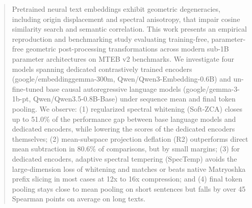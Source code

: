 \begin{abstract}
Pretrained neural text embeddings exhibit geometric degeneracies, including origin displacement and spectral anisotropy, that impair cosine similarity search and semantic correlation. This work presents an empirical reproduction and benchmarking study evaluating training-free, parameter-free geometric post-processing transformations across modern sub-1B parameter architectures on MTEB v2 benchmarks. We investigate four models spanning dedicated contrastively trained encoders (google/embeddinggemma-300m, Qwen/Qwen3-Embedding-0.6B) and un-fine-tuned base causal autoregressive language models (google/gemma-3-1b-pt, Qwen/Qwen3.5-0.8B-Base) under sequence mean and final token pooling. We observe: (1) regularized spectral whitening (Soft-ZCA) closes up to 51.0\% of the performance gap between base language models and dedicated encoders, while lowering the scores of the dedicated encoders themselves; (2) mean-subspace projection deflation (R2) outperforms direct mean subtraction in 80.6\% of comparisons, but by small margins; (3) for dedicated encoders, adaptive spectral tempering (SpecTemp) avoids the large-dimension loss of whitening and matches or beats native Matryoshka prefix slicing in most cases at 12x to 16x compression; and (4) final token pooling stays close to mean pooling on short sentences but falls by over 45 Spearman points on average on long texts.
\end{abstract}
